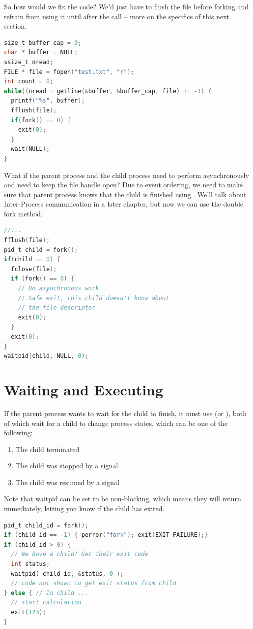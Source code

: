 So how would we fix the code?
We'd just have to flush the file before forking and refrain from using it until after the  call -- more on the specifics of this next section.

\begin{lstlisting}[language=C]
size_t buffer_cap = 0;
char * buffer = NULL;
ssize_t nread;
FILE * file = fopen("test.txt", "r");
int count = 0;
while((nread = getline(&buffer, &buffer_cap, file) != -1) {
  printf("%s", buffer);
  fflush(file);
  if(fork() == 0) { 
    exit(0);
  }
  wait(NULL);
}
\end{lstlisting}

What if the parent process and the child process need to perform asynchronously and need to keep the file handle open?
Due to event ordering, we need to make sure that parent process knows that the child is finished using .
We'll talk about Inter-Process communication in a later chapter, but now we can use the double fork method.

\begin{lstlisting}[language=C]
//... 
fflush(file);
pid_t child = fork();
if(child == 0) { 
  fclose(file);
  if (fork() == 0) {
    // Do asynchronous work
    // Safe exit, this child doesn't know about
    // the file descriptor
    exit(0);
  }
  exit(0);
}
waitpid(child, NULL, 0);
\end{lstlisting}

\section{Waiting and Executing}

If the parent process wants to wait for the child to finish, it must use  (or ), both of which wait for a child to change process states, which can be one of the following:

\begin{enumerate}
\item The child terminated
\item The child was stopped by a signal
\item The child was resumed by a signal
\end{enumerate}

Note that waitpid can be set to be non-blocking, which means they will return immediately, letting you know if the child has exited.

\begin{lstlisting}[language=C]
pid_t child_id = fork();
if (child_id == -1) { perror("fork"); exit(EXIT_FAILURE);}
if (child_id > 0) {
  // We have a child! Get their exit code
  int status;
  waitpid( child_id, &status, 0 );
  // code not shown to get exit status from child
} else { // In child ...
  // start calculation
  exit(123);
}
\end{lstlisting}

